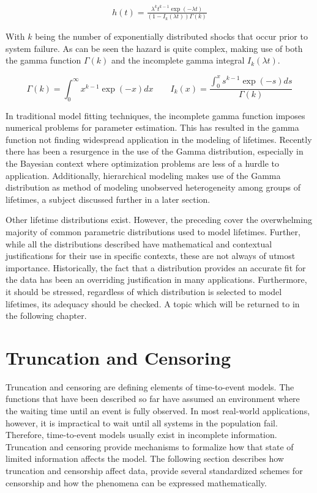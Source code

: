 \begin{align*}
h(t) = \frac{\lambda^k t^{k-1} \exp(-\lambda t)}{(1 - I_k(\lambda t)) \Gamma(k)} \tag{$ k>0, \lambda > 0 $}
\end{align*}

With $k$ being the number of exponentially distributed shocks that occur prior to system failure. As can be seen the hazard is quite complex, making use of both the gamma function $\Gamma(k)$ and the incomplete gamma integral $I_k(\lambda t)$.

$$ \Gamma(k) = \int_0^\infty x^{k-1} \exp(-x) dx \qquad I_k(x) = \frac{\int_0^x s^{k-1} \exp(-s) ds}{\Gamma(k)} $$

In traditional model fitting techniques, the incomplete gamma function imposes numerical problems for parameter estimation\cite{Wienke2010}. This has resulted in the gamma function not finding widespread application in the modeling of lifetimes. Recently there has been a resurgence in the use of the Gamma distribution, especially in the Bayesian context where optimization problems are less of a hurdle to application. Additionally, hierarchical modeling makes use of the Gamma distribution as method of modeling unobserved heterogeneity among groups of lifetimes, a subject discussed further in a later section.


Other lifetime distributions exist. However, the preceding cover the overwhelming majority of common parametric distributions used to model lifetimes. Further, while all the distributions described have mathematical and contextual justifications for their use in specific contexts, these are not always of utmost importance. Historically, the fact that a distribution provides an accurate fit for the data has been an overriding justification in many applications\cite{Marshall2007}. Furthermore, it should be stressed, regardless of which distribution is selected to model lifetimes, its adequacy should be checked. A topic which will be returned to in the following chapter.


\section*{Truncation and Censoring}


Truncation and censoring are defining elements of time-to-event models. The functions that have been described so far have assumed an environment where the waiting time until an event is fully observed. In most real-world applications, however, it is impractical to wait until all systems in the population fail. Therefore, time-to-event models usually exist in incomplete information. Truncation and censoring provide mechanisms to formalize how that state of limited information affects the model. The following section describes how truncation and censorship affect data, provide several standardized schemes for censorship and how the phenomena can be expressed mathematically.

